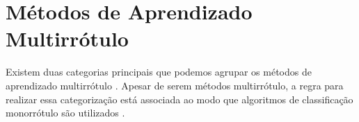 

\section {Métodos de Aprendizado Multirrótulo}

Existem duas categorias principais que podemos agrupar os métodos de aprendizado multirrótulo \cite{tsoumakas2007multi}. Apesar de serem métodos multirrótulo, a regra para realizar essa categorização está associada ao modo que algoritmos de classificação monorrótulo são utilizados \cite{tsoumakas2009mining}.

